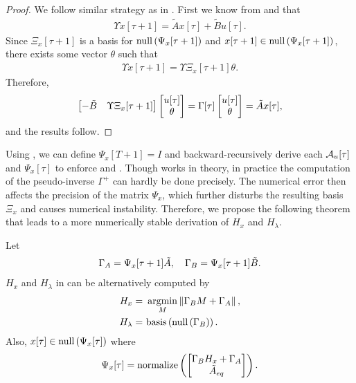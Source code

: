 \begin{proof}
We follow similar strategy as in \cite{tseng2020system}. First we know from  and  that 
\begin{align*}
\Upsilon x[\tau+1] = \tilde{A} x[\tau] + \tilde{B} u[\tau].
\end{align*}
Since $\Xi_x[\tau+1]$ is a basis for $\text{\rm null}\left(\Psi_x[\tau+1]\right)$ and $x[\tau + 1] \in \text{\rm null}\left(\Psi_x[\tau+1]\right)$, there exists some vector $\theta$ such that
\begin{align*}
\Upsilon x[\tau+1] = \Upsilon \Xi_x[\tau+1] \theta.
\end{align*}
Therefore, 
\begin{align*}
\begin{bmatrix}-\tilde{B} & \Upsilon \Xi_x[\tau+1]\end{bmatrix} \begin{bmatrix}u[\tau]\\ \theta\end{bmatrix} = \Gamma[\tau]\begin{bmatrix}u[\tau]\\ \theta\end{bmatrix} = \tilde{A} x[\tau],
\end{align*}
and the results follow.
\end{proof}
\fi

Using , we can define $\Psi_x[T + 1] = I$ and backward-recursively derive each $\mathcal{A}_u[\tau]$ and $\Psi_x[\tau]$ to enforce  and . Though  works in theory, in practice the computation of the pseudo-inverse $\Gamma^+$ can hardly be done precisely. The numerical error then affects the precision of the matrix $\Psi_x$, which further disturbs the resulting basis $\Xi_x$ and causes numerical instability. Therefore, we propose the following theorem that leads to a more numerically stable derivation of $H_x$ and $H_\lambda$.

\begin{theorem}\label{thm:feasible_set}
  Let 
\begin{align*}
\Gamma_A = \Psi_x[\tau+1] \tilde{A}, \quad \Gamma_B = \Psi_x[\tau+1] \tilde{B}.
\end{align*}
  $H_x$ and $H_\lambda$ in  can be alternatively computed by 
  \begin{align*}
    H_x =&\ \operatorname*{argmin}_{M} \left\lVert \Gamma_B M + \Gamma_A \right\rVert,\\
    H_\lambda =&\ \text{\rm basis}\left(\text{\rm null}\left(\Gamma_B\right)\right).
  \end{align*}
 Also, $x[\tau] \in \text{\rm null}\left(\Psi_x[\tau]\right)$ where 
  \begin{align*}
    \Psi_x[\tau] = \text{\rm normalize}\left(\begin{bmatrix}
      \Gamma_B H_x + \Gamma_A\\
      \tilde{A}_{eq}
    \end{bmatrix}\right).
  \end{align*}
\end{theorem}


